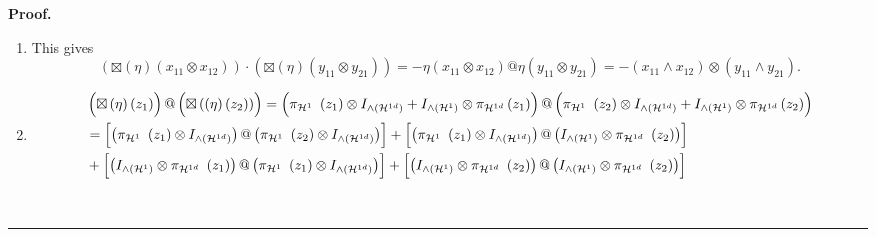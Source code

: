 \documentclass[aps,preprint]{revtex4}%
\newenvironment{proof}[1][Proof]{\noindent\textbf{#1.} }{\ \rule{0.5em}{0.5em}}
\begin{document}
\begin{proof}
\begin{enumerate}
\item This gives
\begin{equation}
\left(  \boxtimes\left(  \eta\right)  \left(  x_{11}\otimes x_{12}\right)
\right)  \cdot\left(  \boxtimes\left(  \eta\right)  \left(  y_{11}\otimes
y_{21}\right)  \right)  =-\eta\left(  x_{11}\otimes x_{12}\right)
@\eta\left(  y_{11}\otimes y_{21}\right)  =-\left(  x_{11}\wedge
x_{12}\right)  \otimes\left(  y_{11}\wedge y_{21}\right)  .
\end{equation}


\item
\begin{align}
&  \left(  \overset{}{\boxtimes\left(  \eta\right)  \left(  z_{1}\right)
}\right)  @\left(  \overset{}{\boxtimes\left(  \left(  \eta\right)  \left(
z_{2}\right)  \right)  }\right)  =\left(  \overset{}{\pi_{\mathcal{H}%
^{1}\mathcal{\ }}\left(  z_{1}\right)  \otimes I_{{\huge \wedge}\left(
\mathcal{H}^{1d}\right)  }+I_{{\huge \wedge}\left(  \mathcal{H}^{1}\right)
}\otimes\pi_{\mathcal{H}^{1d}}\left(  z_{1}\right)  }\right)  @\left(
\overset{}{\pi_{\mathcal{H}^{1}\mathcal{\ }}\left(  z_{2}\right)  \otimes
I_{{\huge \wedge}\left(  \mathcal{H}^{1d}\right)  }+I_{{\huge \wedge}\left(
\mathcal{H}^{1}\right)  }\otimes\pi_{\mathcal{H}^{1d}}\left(  z_{2}\right)
}\right) \\
&  =\left[  \overset{}{\left(  \pi_{\mathcal{H}^{1}\mathcal{\ }}\left(
z_{1}\right)  \otimes I_{{\huge \wedge}\left(  \mathcal{H}^{1d}\right)
}\right)  @\left(  \pi_{\mathcal{H}^{1}\mathcal{\ }}\left(  z_{2}\right)
\otimes I_{{\huge \wedge}\left(  \mathcal{H}^{1d}\right)  }\right)  }\right]
+\left[  \overset{}{\left(  \pi_{\mathcal{H}^{1}\mathcal{\ }}\left(
z_{1}\right)  \otimes I_{{\huge \wedge}\left(  \mathcal{H}^{1d}\right)
}\right)  @\left(  I_{{\huge \wedge}\left(  \mathcal{H}^{1}\right)  }%
\otimes\pi_{\mathcal{H}^{1d}\mathcal{\ }}\left(  z_{2}\right)  \right)
}\right] \\
&  +\left[  \overset{}{\left(  I_{{\huge \wedge}\left(  \mathcal{H}%
^{1}\right)  }\otimes\pi_{\mathcal{H}^{1d}\mathcal{\ }}\left(  z_{1}\right)
\right)  @\left(  \pi_{\mathcal{H}^{1}\mathcal{\ }}\left(  z_{1}\right)
\otimes I_{{\huge \wedge}\left(  \mathcal{H}^{1d}\right)  }\right)  }\right]
+\left[  \overset{}{\left(  I_{{\huge \wedge}\left(  \mathcal{H}^{1}\right)
}\otimes\pi_{\mathcal{H}^{1d}\mathcal{\ }}\left(  z_{2}\right)  \right)
@\left(  I_{{\huge \wedge}\left(  \mathcal{H}^{1}\right)  }\otimes
\pi_{\mathcal{H}^{1d}\mathcal{\ }}\left(  z_{2}\right)  \right)  }\right] \\

\end{align}
\end{enumerate}
\end{proof}
\end{document}

